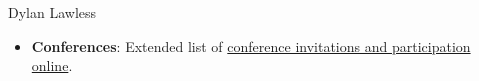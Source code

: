 \documentclass[11pt,a4paper]{article}
\begin{document}
\begin{cv}{Dylan Lawless}
\begin{itemize}[leftmargin=*]
\item \textbf{Conferences}: Extended list of \href{https://lawlessgenomics.com/resume/}{conference invitations and participation online}.


\end{itemize}
\end{cv}
\end{document}

